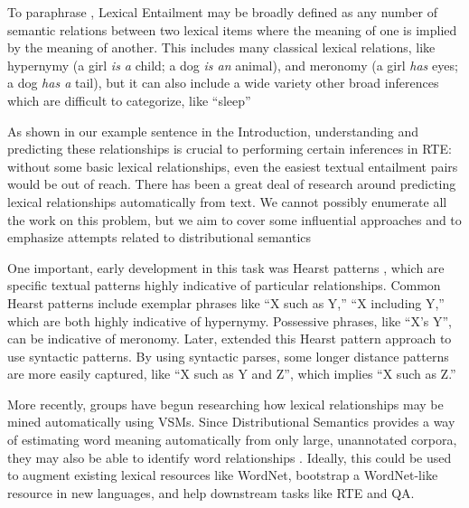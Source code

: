 \documentclass[12pt]{article}
\begin{document}
To paraphrase , Lexical Entailment may be broadly
defined as any number of semantic relations between two lexical items where the
meaning of one is implied by the meaning of another.
This includes many classical lexical relations, like hypernymy
(a girl {\em is a} child; a dog {\em is an} animal), and meronomy
(a girl {\em has} eyes; a dog {\em has a} tail), but it can also include a
wide variety other broad inferences which are difficult to categorize,
like ``sleep''

As shown in our example
sentence in the Introduction, understanding and predicting these relationships
is crucial to performing certain inferences in RTE: without some basic lexical
relationships, even the easiest textual entailment pairs would be out of
reach. There has been a great deal of research around predicting lexical
relationships automatically from text. We cannot possibly enumerate all the
work on this problem, but we aim to cover some influential approaches and to
emphasize attempts related to distributional semantics

One important, early development in this task was Hearst patterns
\cite{hearst:1992:coling}, which are specific textual patterns highly
indicative of particular relationships. Common Hearst patterns include
exemplar phrases like ``X such as Y,'' ``X including Y,'' which are both highly
indicative of hypernymy. Possessive phrases, like ``X's Y'', can be indicative
of meronomy. Later,
 extended this Hearst pattern approach
to use syntactic patterns. By using syntactic parses, some longer distance patterns
are more easily captured, like ``X such as Y and Z'', which implies ``X such as Z.''

More recently, groups have begun researching how lexical relationships may be
mined automatically using VSMs. Since Distributional
Semantics provides a way of estimating word meaning automatically from only
large, unannotated corpora, they may also be able to identify
word relationships \cite{baroni:2011:gems,baroni:2012:eacl}. Ideally, this
could be used to augment existing lexical resources like WordNet, bootstrap
a WordNet-like resource in new languages, and help downstream tasks like RTE
and QA.
\end{document}
